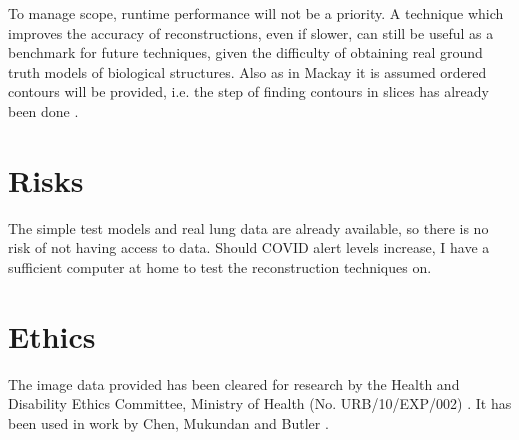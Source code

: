 \documentclass[12pt]{article}
\begin{document}
To manage scope, runtime performance will not be a priority. A technique which improves the accuracy of reconstructions, even if slower, can still be useful as a benchmark for future techniques, given the difficulty of obtaining real ground truth models of biological structures. Also as in Mackay it is assumed ordered contours will be provided, i.e. the step of finding contours in slices has already been done \cite{mukundan2016reconstruction}.

\section{Risks}
The simple test models and real lung data are already available, so there is no risk of not having access to data. Should COVID alert levels increase, I have a sufficient computer at home to test the reconstruction techniques on.

\section{Ethics}
The image data provided has been cleared for research by the Health and Disability Ethics Committee, Ministry of Health (No. URB/10/EXP/002) \cite{health2010annual}. It has been used in work by Chen, Mukundan and Butler \cite{chen2011automatic}.

\pagebreak


\end{document}
